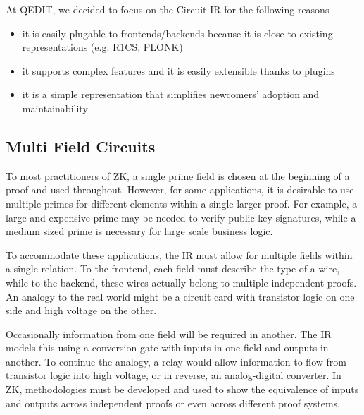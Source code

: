 At QEDIT, we decided to focus on the Circuit IR for the following reasons 
\begin{itemize}
\item it is easily plugable to frontends/backends because it is close to existing representations (e.g. R1CS, PLONK)
\item it supports complex features and it is easily extensible thanks to plugins
\item it is a simple representation that simplifies newcomers' adoption and maintainability
\end{itemize}


\subsection{Multi Field Circuits}
To most practitioners of ZK, a single prime field is chosen at the beginning of a proof and used throughout.
However, for some applications, it is desirable to use multiple primes for different elements within a single larger proof.
For example, a large and expensive prime may be needed to verify public-key signatures, while a medium sized prime is necessary for large scale business logic.

To accommodate these applications, the IR must allow for multiple fields within a single relation.
To the frontend, each field must describe the type of a wire, while to the backend, these wires actually belong to multiple independent proofs.
An analogy to the real world might be a circuit card with transistor logic on one side and high voltage on the other.

Occasionally information from one field will be required in another.
The IR models this using a conversion gate with inputs in one field and outputs in another.
To continue the analogy, a relay would allow information to flow from transistor logic into high voltage, or in reverse, an analog-digital converter.
In ZK, methodologies must be developed and used to show the equivalence of inputs and outputs across independent proofs or even across different proof systems.

